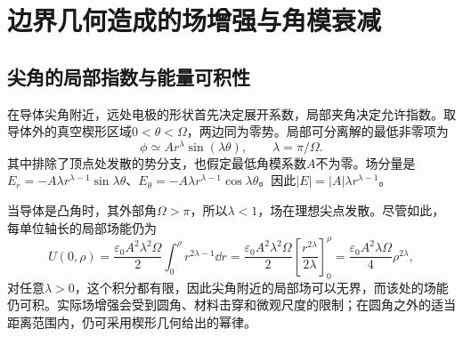 \section{边界几何造成的场增强与角模衰减}
\subsection{尖角的局部指数与能量可积性}
在导体尖角附近，远处电极的形状首先决定展开系数，局部夹角决定允许指数。取导体外的真空楔形区域$0<\theta<\Omega$，两边同为零势。局部可分离解的最低非零项为
\[
 \phi\simeq A r^\lambda\sin(\lambda\theta),
 \qquad \lambda=\pi/\Omega.
\]
其中排除了顶点处发散的势分支，也假定最低角模系数$A$不为零。场分量是$E_r=-A\lambda r^{\lambda-1}\sin\lambda\theta$、$E_\theta=-A\lambda r^{\lambda-1}\cos\lambda\theta$。因此$|E|=|A|\lambda r^{\lambda-1}$。

当导体是凸角时，其外部角$\Omega>\pi$，所以$\lambda<1$，场在理想尖点发散。尽管如此，每单位轴长的局部场能仍为
\[
 U(0,\rho)=\frac{\varepsilon_0A^2\lambda^2\Omega}{2}
 \int_0^\rho r^{2\lambda-1}\dd r
 =\frac{\varepsilon_0A^2\lambda^2\Omega}{2}
 \left[\frac{r^{2\lambda}}{2\lambda}\right]_0^\rho
 =\frac{\varepsilon_0A^2\lambda\Omega}{4}\rho^{2\lambda},
\]
对任意$\lambda>0$，这个积分都有限，因此尖角附近的局部场可以无界，而该处的场能仍可积。实际场增强会受到圆角、材料击穿和微观尺度的限制；在圆角之外的适当距离范围内，仍可采用楔形几何给出的幂律。

